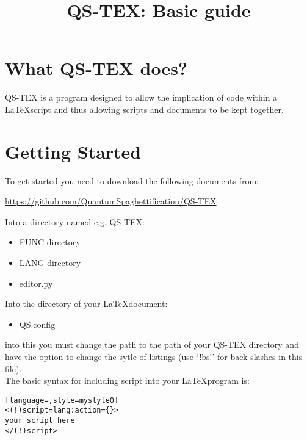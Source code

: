\documentclass[a4paper,12pt,twocolum]{article}
\title{QS-TEX: Basic guide}
\begin{document}
\maketitle
\section{What QS-TEX does?}
QS-TEX is a program designed to allow the implication of code within a \LaTeX  script and thus allowing scripts and documents to be kept together. 
\section{Getting Started}
To get started you need to download the following documents from:
\begin{center} \url{https://github.com/QuantumSpaghettification/QS-TEX} \end{center}
Into a directory named e.g. QS-TEX:
\begin{itemize}
\item FUNC directory
\item LANG directory
\item editor.py
\end{itemize}
Into the directory of your \LaTeX  document:
\begin{itemize}
\item QS.config
\end{itemize}
into this you must change the path to the path of your QS-TEX directory and have the option to change the sytle of listings (use `!bs!' for back slashes in this file).\\
The basic syntax for including script into your \LaTeX  program is:


\begin{lstlisting}[language=,style=mystyle0]
<(!)script=lang:action={}>
your script here
</(!)script>
\end{lstlisting}
          
\end{document}
